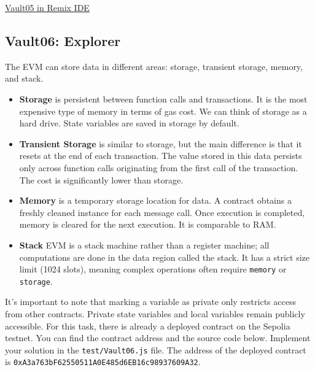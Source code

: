 \documentclass[12pt]{article}
\begin{document}
\medskip
\noindent
\href{https://remix.ethereum.org/?#activate=solidity&url=https://github.com/radovluk/unbreakable-vault/contracts/Vault05.sol&lang=en&optimize=false&runs=200&evmVersion=null&version=soljson-v0.8.28+commit.7893614a.js}{Vault05 in Remix IDE}

\subsection*{Vault06: Explorer}

The EVM can store data in different areas: storage, transient storage, memory, and
stack.

\begin{itemize}
    \item \textbf{Storage} is persistent between function calls and transactions. It is the most expensive type of memory in terms of gas cost. We can think of storage as a hard drive. State variables are saved in storage by default.

    \item \textbf{Transient Storage} is similar to storage, but the main difference is that it resets at the end of each transaction. The value stored in this data persists only across function calls originating from the first call of the transaction. The cost is significantly lower than storage.

    \item \textbf{Memory} is a temporary storage location for data. A contract obtains a freshly cleaned instance for each message call. Once execution is completed, memory is cleared for the next execution. It is comparable to RAM.

    \item \textbf{Stack} EVM is a stack machine rather than a register machine; all computations are done in the data region called the stack. It has a strict size limit (1024 slots), meaning complex operations often require \texttt{memory} or \texttt{storage}.

\end{itemize}

\noindent
It's important to note that marking a variable as private only restricts access from other contracts. Private state variables and local variables remain publicly accessible. For this task, there is already a deployed contract on the Sepolia testnet. You can find the contract address and the source code below. Implement your solution in the \texttt{test/Vault06.js} file. The address of the deployed contract is \texttt{0xA3a763bF62550511A0E485d6EB16c98937609A32}.
\end{document}
